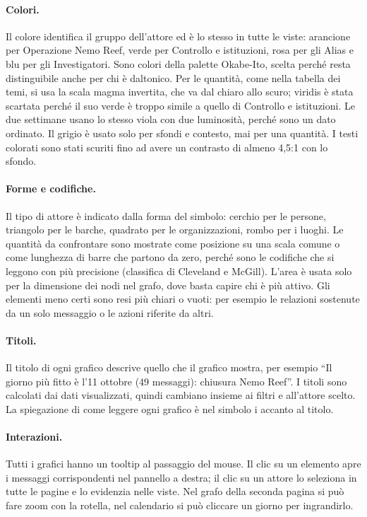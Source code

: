 \documentclass[11pt,a4paper]{article}
\begin{document}
\paragraph{Colori.} Il colore identifica il gruppo dell'attore ed è lo stesso in tutte le viste: arancione per
Operazione Nemo Reef, verde per Controllo e istituzioni, rosa per gli Alias e blu per gli Investigatori. Sono
colori della palette Okabe-Ito, scelta perché resta distinguibile anche per chi è daltonico. Per le quantità, come
nella tabella dei temi, si usa la scala magma invertita, che va dal chiaro allo scuro; viridis è stata scartata
perché il suo verde è troppo simile a quello di Controllo e istituzioni. Le due settimane usano lo stesso
viola con due luminosità, perché sono un dato ordinato. Il grigio è usato solo per sfondi e contesto, mai per
una quantità. I testi colorati sono stati scuriti fino ad avere un contrasto di almeno 4,5:1 con lo sfondo.

\paragraph{Forme e codifiche.} Il tipo di attore è indicato dalla forma del simbolo: cerchio per le persone,
triangolo per le barche, quadrato per le organizzazioni, rombo per i luoghi. Le quantità da confrontare sono
mostrate come posizione su una scala comune o come lunghezza di barre che partono da zero, perché sono le
codifiche che si leggono con più precisione (classifica di Cleveland e McGill). L'area è usata solo per la dimensione dei
nodi nel grafo, dove basta capire chi è più attivo. Gli elementi meno certi sono resi più chiari o vuoti: per
esempio le relazioni sostenute da un solo messaggio o le azioni riferite da altri.

\paragraph{Titoli.} Il titolo di ogni grafico descrive quello che il grafico mostra, per esempio ``Il giorno
più fitto è l'11 ottobre (49 messaggi): chiusura Nemo Reef''. I titoli sono calcolati dai dati visualizzati,
quindi cambiano insieme ai filtri e all'attore scelto. La spiegazione di come leggere ogni grafico è nel
simbolo \textsf{i} accanto al titolo.

\paragraph{Interazioni.} Tutti i grafici hanno un tooltip al passaggio del mouse. Il clic su un elemento apre i
messaggi corrispondenti nel pannello a destra; il clic su un attore lo seleziona in tutte le pagine e lo
evidenzia nelle viste. Nel grafo della seconda pagina si può fare zoom con la rotella, nel calendario si può
cliccare un giorno per ingrandirlo.
\end{document}
